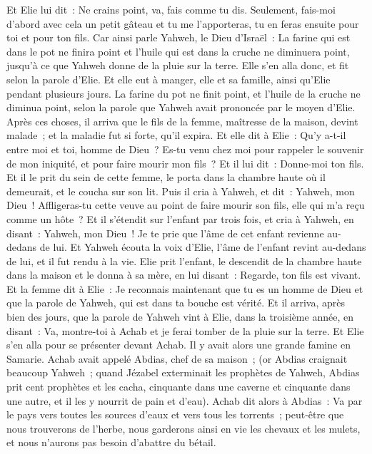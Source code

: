 \begin{multicols}{2}
Et Elie lui dit~: Ne crains point, va, fais comme tu dis. Seulement, fais-moi d'abord avec cela un petit gâteau et tu me l'apporteras, tu en feras ensuite pour toi et pour ton fils.
Car ainsi parle Yahweh, le Dieu d'Israël~: La farine qui est dans le pot ne finira point et l'huile qui est dans la cruche ne diminuera point, jusqu'à ce que Yahweh donne de la pluie sur la terre.
Elle s'en alla donc, et fit selon la parole d'Elie. Et elle eut à manger, elle et sa famille, ainsi qu'Elie pendant plusieurs jours.
La farine du pot ne finit point, et l'huile de la cruche ne diminua point, selon la parole que Yahweh avait prononcée par le moyen d'Elie.
Après ces choses, il arriva que le fils de la femme, maîtresse de la maison, devint malade~; et la maladie fut si forte, qu'il expira.
Et elle dit à Elie~: Qu'y a-t-il entre moi et toi, homme de Dieu~? Es-tu venu chez moi pour rappeler le souvenir de mon iniquité, et pour faire mourir mon fils~?
Et il lui dit~: Donne-moi ton fils. Et il le prit du sein de cette femme, le porta dans la chambre haute où il demeurait, et le coucha sur son lit.
Puis il cria à Yahweh, et dit~: Yahweh, mon Dieu~! Affligeras-tu cette veuve au point de faire mourir son fils, elle qui m'a reçu comme un hôte~?
Et il s'étendit sur l'enfant par trois fois, et cria à Yahweh, en disant~: Yahweh, mon Dieu~! Je te prie que l'âme de cet enfant revienne au-dedans de lui.
Et Yahweh écouta la voix d'Elie, l'âme de l'enfant revint au-dedans de lui, et il fut rendu à la vie.
Elie prit l'enfant, le descendit de la chambre haute dans la maison et le donna à sa mère, en lui disant~: Regarde, ton fils est vivant.
Et la femme dit à Elie~: Je reconnais maintenant que tu es un homme de Dieu et que la parole de Yahweh, qui est dans ta bouche est vérité.
\VerseOne{}Et il arriva, après bien des jours, que la parole de Yahweh vint à Elie, dans la troisième année, en disant~: Va, montre-toi à Achab et je ferai tomber de la pluie sur la terre.
Et Elie s'en alla pour se présenter devant Achab. Il y avait alors une grande famine en Samarie.
Achab avait appelé Abdias, chef de sa maison~; (or Abdias craignait beaucoup Yahweh~;
quand Jézabel exterminait les prophètes de Yahweh, Abdias prit cent prophètes et les cacha, cinquante dans une caverne et cinquante dans une autre, et il les y nourrit de pain et d'eau).
Achab dit alors à Abdias~: Va par le pays vers toutes les sources d'eaux et vers tous les torrents~; peut-être que nous trouverons de l'herbe, nous garderons ainsi en vie les chevaux et les mulets, et nous n'aurons pas besoin d'abattre du bétail.

\end{multicols}
